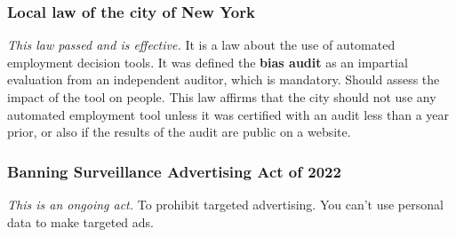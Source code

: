 \subsubsection{Local law of the city of New York}
\textit{This law passed and is effective.} It is a law about the use of automated employment decision tools. It was defined the \textbf{bias audit} as an impartial evaluation from an independent auditor, which is mandatory. Should assess the impact of the tool on people. This law affirms that the city should not use any automated employment tool unless it was certified with an audit less than a year prior, or also if the results of the audit are public on a website.
\subsubsection{Banning Surveillance Advertising Act of 2022}
\textit{This is an ongoing act.} To prohibit targeted advertising. You can't use personal data to make targeted ads.
